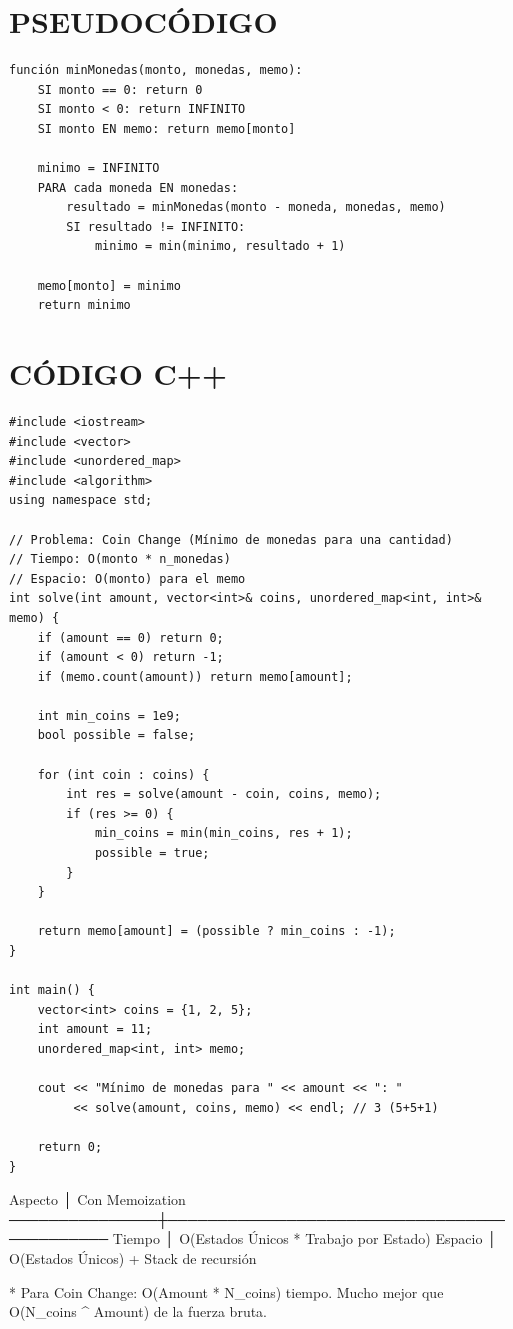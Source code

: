 \section*{PSEUDOCÓDIGO}
\hrulefill
\begin{verbatim}
función minMonedas(monto, monedas, memo):
    SI monto == 0: return 0
    SI monto < 0: return INFINITO
    SI monto EN memo: return memo[monto]

    minimo = INFINITO
    PARA cada moneda EN monedas:
        resultado = minMonedas(monto - moneda, monedas, memo)
        SI resultado != INFINITO:
            minimo = min(minimo, resultado + 1)

    memo[monto] = minimo
    return minimo
\end{verbatim}
\section*{CÓDIGO C++}
\hrulefill
\begin{lstlisting}
#include <iostream>
#include <vector>
#include <unordered_map>
#include <algorithm>
using namespace std;

// Problema: Coin Change (Mínimo de monedas para una cantidad)
// Tiempo: O(monto * n_monedas)
// Espacio: O(monto) para el memo
int solve(int amount, vector<int>& coins, unordered_map<int, int>& memo) {
    if (amount == 0) return 0;
    if (amount < 0) return -1;
    if (memo.count(amount)) return memo[amount];

    int min_coins = 1e9;
    bool possible = false;

    for (int coin : coins) {
        int res = solve(amount - coin, coins, memo);
        if (res >= 0) {
            min_coins = min(min_coins, res + 1);
            possible = true;
        }
    }

    return memo[amount] = (possible ? min_coins : -1);
}

int main() {
    vector<int> coins = {1, 2, 5};
    int amount = 11;
    unordered_map<int, int> memo;
    
    cout << "Mínimo de monedas para " << amount << ": " 
         << solve(amount, coins, memo) << endl; // 3 (5+5+1)
    
    return 0;
}
\end{lstlisting}
\begin{dsacomplejidad}
Aspecto        │ Con Memoization
  ───────────────┼────────────────────────────────────────────
  Tiempo         │ O(Estados Únicos * Trabajo por Estado)
  Espacio        │ O(Estados Únicos) + Stack de recursión

* Para Coin Change: O(Amount * N\_coins) tiempo. Mucho mejor que
  O(N\_coins \textasciicircum{} Amount) de la fuerza bruta.
\end{dsacomplejidad}
